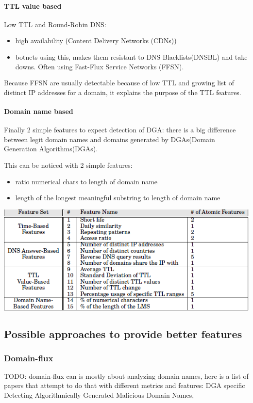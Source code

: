 \paragraph{TTL value based}
Low TTL and Round-Robin DNS: \\
\begin{itemize}
\item high availability (Content Delivery Networks (CDNs))
\item botnets using this, makes them resistant to DNS Blacklists(DNSBL) and take downs. Often using Fast-Flux Service Networks (FFSN).
\end{itemize}
Because FFSN are usually detectable because of low TTL and growing list of distinct IP addresses for a domain, it explains the purpose of the TTL features.
\paragraph{Domain name based}
Finally 2 simple features to expect detection of DGA: there is a big difference between legit domain names and domains generated by DGAs(Domain Generation Algorithms(DGAs).

This can be noticed with 2 simple features:\\
\begin{itemize}
\item ratio numerical chars to length of domain name
\item length of the longest meaningful substring to length of domain name
\end{itemize}
\includegraphics[scale=.3]{img/exposure_features.png}

\subsection{Possible approaches to provide better features}
\subsubsection{Domain-flux}
TODO: domain-flux can is mostly about analyzing domain names, here is a list of papers that attempt to do that with different metrics and features:  
DGA specific\\
Detecting Algorithmically Generated Malicious Domain Names, %
